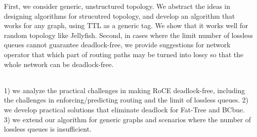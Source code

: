  First, we consider generic, unstructured topology. 
We abstract the ideas in designing algorithms for strucutred topology, and develop an algorithm that works for
any graph, using TTL as a generic tag. We show that it works well for random topology like Jellyfish.
Second, in cases where the limit number of lossless queues cannot guarantee deadlock-free, we provide suggestions for 
network operator that which part of routing paths may be turned into lossy so that the whole network can be deadlock-free.

 \\

 1) we analyze the practical challenges in making RoCE deadlock-free, including 
the challenges in enforcing/predicting routing and the limit of lossless queues. 2) we develop practical solutions
that eliminate deadlock for Fat-Tree and BCbue. 3) we extend our algorithm for generic graphs and scenarios
where the number of lossless queues is insufficient.



